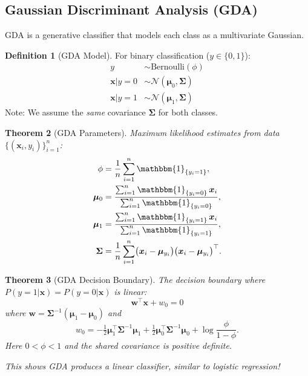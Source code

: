 \documentclass[11pt,twoside]{article}
\numberwithin{equation}{section}
\newcommand{\vect}[1]{\bm{#1}}
\newcommand{\mat}[1]{\bm{#1}}
\newcommand{\indicator}[1]{\mathbbm{1}_{\{#1\}}}
\theoremstyle{plain}
\newtheorem{theorem}{Theorem}[section]
\theoremstyle{definition}
\newtheorem{definition}[theorem]{Definition}
\theoremstyle{remark}
\begin{document}
\subsection{Gaussian Discriminant Analysis (GDA)}

GDA is a generative classifier that models each class as a multivariate Gaussian.

\begin{definition}[GDA Model]
For binary classification ($y \in \{0, 1\}$):
\begin{align}
y &\sim \text{Bernoulli}(\phi) \\
\vect{x}|y=0 &\sim \mathcal{N}(\vect{\mu}_0, \mat{\Sigma}) \\
\vect{x}|y=1 &\sim \mathcal{N}(\vect{\mu}_1, \mat{\Sigma})
\end{align}
Note: We assume the \emph{same} covariance $\mat{\Sigma}$ for both classes.
\end{definition}

\begin{theorem}[GDA Parameters]
Maximum likelihood estimates from data $\{(\vect{x}_i, y_i)\}_{i=1}^n$:
\begin{align}
\phi &= \frac{1}{n} \sum_{i=1}^n \indicator{y_i=1}, \\
\boldsymbol{\mu}_0 &= \frac{\sum_{i=1}^n \indicator{y_i=0}\,\boldsymbol{x}_i}{\sum_{i=1}^n \indicator{y_i=0}}, \\
\boldsymbol{\mu}_1 &= \frac{\sum_{i=1}^n \indicator{y_i=1}\,\boldsymbol{x}_i}{\sum_{i=1}^n \indicator{y_i=1}}, \\
\boldsymbol{\Sigma} &= \frac{1}{n} \sum_{i=1}^n \bigl(\boldsymbol{x}_i - \boldsymbol{\mu}_{y_i}\bigr)\bigl(\boldsymbol{x}_i - \boldsymbol{\mu}_{y_i}\bigr)^\top.
\end{align}
\end{theorem}

\begin{theorem}[GDA Decision Boundary]
The decision boundary where $P(y=1|\vect{x}) = P(y=0|\vect{x})$ is linear:
\[
\vect{w}^\top\vect{x} + w_0 = 0
\]
where $\vect{w} = \mat{\Sigma}^{-1}(\vect{\mu}_1 - \vect{\mu}_0)$ and
\[
w_0=-\tfrac12\vect{\mu}_1^\top\mat{\Sigma}^{-1}\vect{\mu}_1
+\tfrac12\vect{\mu}_0^\top\mat{\Sigma}^{-1}\vect{\mu}_0
+\log\frac{\phi}{1-\phi}.
\]
Here $0<\phi<1$ and the shared covariance is positive definite.

This shows GDA produces a linear classifier, similar to logistic regression!
\end{theorem}
\end{document}
